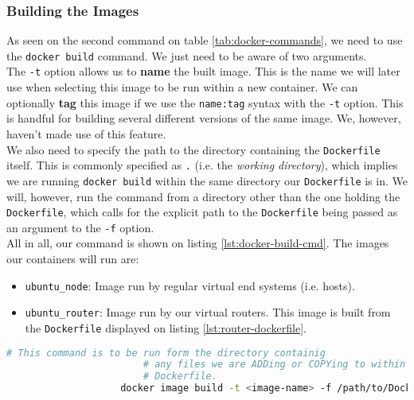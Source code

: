             \subsubsection{Building the Images}
                As seen on the second command on table \ref{tab:docker-commands}, we need to use the \texttt{docker build} command. We just need to be aware of two arguments.\\

                The \texttt{-t} option allows us to \textbf{name} the built image. This is the name we will later use when selecting this image to be run within a new container. We can optionally \textbf{tag} this image if we use the \texttt{name:tag} syntax with the \texttt{-t} option. This is handful for building several different versions of the same image. We, however, haven't made use of this feature.\\

                We also need to specify the path to the directory containing the \texttt{Dockerfile} itself. This is commonly specified as \texttt{.} (i.e. the \textit{working directory}), which implies we are running \texttt{docker build} within the same directory our \texttt{Dockerfile} is in. We will, however, run the command from a directory other than the one holding the \texttt{Dockerfile}, which calls for the explicit path to the \texttt{Dockerfile} being passed as an argument to the \texttt{-f} option.\\

                All in all, our command is shown on listing \ref{lst:docker-build-cmd}. The images our containers will run are:\\

                \begin{itemize}
                    \item \texttt{ubuntu\_node}: Image run by regular virtual end systems (i.e. hosts).
                    \item \texttt{ubuntu\_router}: Image run by our virtual routers. This image is built from the \texttt{Dockerfile} displayed on listing \ref{lst:router-dockerfile}.
                \end{itemize}

                \begin{lstlisting}[language = bash, caption = Building an image from a \texttt{Dockerfile}., label = lst:docker-build-cmd]
                    # This command is to be run form the directory containig
                        # any files we are ADDing or COPYing to within the
                        # Dockerfile.
                    docker image build -t <image-name> -f /path/to/Dockerfile .
                \end{lstlisting}

